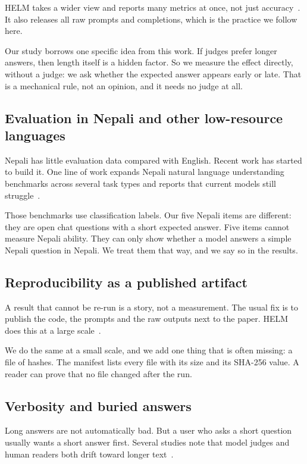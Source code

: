 \documentclass[11pt,a4paper]{article}
\begin{document}
HELM takes a wider view and reports many metrics at once, not just accuracy~\cite{liang2023helm}. It also releases all raw prompts and completions, which is the practice we follow here.

Our study borrows one specific idea from this work. If judges prefer longer answers, then length itself is a hidden factor. So we measure the effect directly, without a judge: we ask whether the expected answer appears early or late. That is a mechanical rule, not an opinion, and it needs no judge at all.

\subsection{Evaluation in Nepali and other low-resource languages}

Nepali has little evaluation data compared with English. Recent work has started to build it. One line of work expands Nepali natural language understanding benchmarks across several task types and reports that current models still struggle~\cite{nyachhyon2025nepali}.

Those benchmarks use classification labels. Our five Nepali items are different: they are open chat questions with a short expected answer. Five items cannot measure Nepali ability. They can only show whether a model answers a simple Nepali question in Nepali. We treat them that way, and we say so in the results.

\subsection{Reproducibility as a published artifact}

A result that cannot be re-run is a story, not a measurement. The usual fix is to publish the code, the prompts and the raw outputs next to the paper. HELM does this at a large scale~\cite{liang2023helm}.

We do the same at a small scale, and we add one thing that is often missing: a file of hashes. The manifest lists every file with its size and its SHA-256 value. A reader can prove that no file changed after the run.

\subsection{Verbosity and buried answers}

Long answers are not automatically bad. But a user who asks a short question usually wants a short answer first. Several studies note that model judges and human readers both drift toward longer text~\cite{zheng2023judge}.
\end{document}

